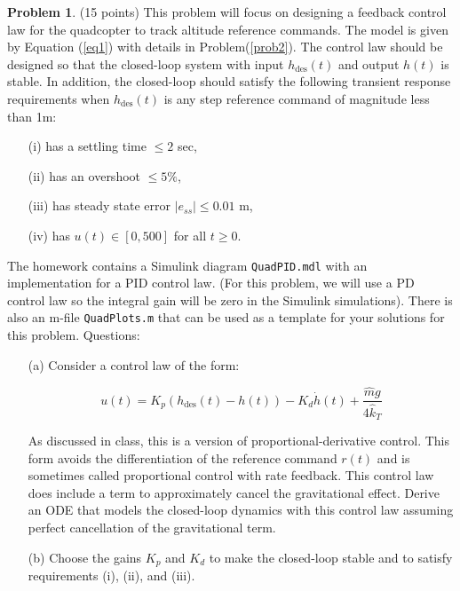 \documentclass{article}
\theoremstyle{definition}
\newtheorem{problem}{Problem}
\newcounter{solution}
\begin{document}
\begin{problem} (15 points) This problem will focus on designing a feedback control law for the quadcopter to track altitude reference commands. The model is given by Equation (\ref{eq1}) with details in Problem(\ref{prob2}). The control law should be designed so that the closed-loop system with input \( h_{\text{des}}(t) \) and output \( h(t) \) is stable. In addition, the closed-loop should satisfy the following transient response requirements when \( h_{\text{des}}(t) \) is any step reference command of magnitude less than 1m:

\begin{itemize}
    \item[(i)] has a settling time \( \leq 2 \) sec,
    \item[(ii)] has an overshoot \( \leq 5 \%\),
    \item[(iii)] has steady state error \( |e_{ss}| \leq 0.01 \) m,
    \item[(iv)] has \( u(t) \in [0, 500] \) for all \( t \geq 0 \).
\end{itemize}

The homework contains a Simulink diagram \texttt{QuadPID.mdl} with an implementation for a PID control law. (For this problem, we will use a PD control law so the integral gain will be zero in the Simulink simulations). There is also an m-file \texttt{QuadPlots.m} that can be used as a template for your solutions for this problem. Questions:

\begin{enumerate}
    \item[(a)] Consider a control law of the form:
    
    \begin{equation}
        u(t) = K_p (h_{\text{des}}(t) - h(t)) - K_d \dot{h}(t) + \frac{\hat{m} g}{4 \hat{k}_T}
    \end{equation}
    
    As discussed in class, this is a version of proportional-derivative control. This form avoids the differentiation of the reference command \( r(t) \) and is sometimes called proportional control with rate feedback. This control law does include a term to approximately cancel the gravitational effect. Derive an ODE that models the closed-loop dynamics with this control law assuming perfect cancellation of the gravitational term.
    
    \item[(b)] Choose the gains \( K_p \) and \( K_d \) to make the closed-loop stable and to satisfy requirements (i), (ii), and (iii).
    

\end{enumerate}
\end{problem}
\end{document}
